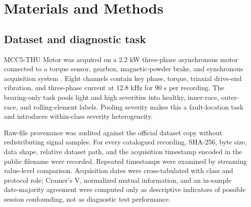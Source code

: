 \documentclass[11pt]{article}
\begin{document}
\section{Materials and Methods}
\subsection{Dataset and diagnostic task}
MCC5-THU Motor was acquired on a 2.2 kW three-phase asynchronous motor connected to a torque sensor, gearbox, magnetic-powder brake, and synchronous acquisition system \cite{Chen2026MCC5DataBrief}. Eight channels contain key phase, torque, triaxial drive-end vibration, and three-phase current at 12.8 kHz for 90 s per recording. The bearing-only task pools light and high severities into healthy, inner-race, outer-race, and rolling-element labels. Pooling severity makes this a fault-location task and introduces within-class severity heterogeneity.

Raw-file provenance was audited against the official dataset copy without redistributing signal samples. For every catalogued recording, SHA-256, byte size, data shape, relative dataset path, and the acquisition timestamp encoded in the public filename were recorded. Repeated timestamps were examined by streaming value-level comparison. Acquisition dates were cross-tabulated with class and protocol role; Cramer's V, normalized mutual information, and an in-sample date-majority agreement were computed only as descriptive indicators of possible session confounding, not as diagnostic test performance.


\begin{table}[H]
\centering
\caption{MCC5 bearing-only data composition.}
\label{tab:dataset}
\small
{}

\end{table}
\end{document}
